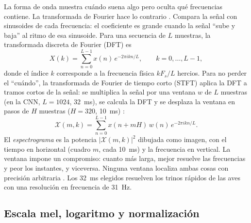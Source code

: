 La forma de onda muestra cuándo suena algo pero oculta qué frecuencias
contiene. La transformada de Fourier hace lo contrario
\citep[pp.~39--41]{muller2021fmp}. Compara la señal con sinusoides de cada
frecuencia: el coeficiente es grande cuando la señal ``sube y baja'' al
ritmo de esa sinusoide. Para una secuencia de $L$ muestras, la transformada
discreta de Fourier (DFT) es \citep[p.~52]{muller2021fmp}
\begin{equation}
  X(k) = \sum_{n=0}^{L-1} x(n)\, e^{-2\pi i k n / L}, \qquad k = 0, \dots, L-1,
  \label{eq:dft}
\end{equation}
donde el índice $k$ corresponde a la frecuencia física $k F_s / L$ hercios.
Para no perder el ``cuándo'', la transformada de Fourier de tiempo corto
(STFT) aplica la DFT a tramos cortos de la señal: se multiplica la señal por
una ventana $w$ de $L$ muestras (en la CNN, $L = 1024$, \SI{32}{\milli\second}),
se calcula la DFT y se desplaza la ventana en pasos de $H$ muestras ($H
= 320$, \SI{10}{\milli\second}) \citep[pp.~53--55]{muller2021fmp}:
\begin{equation}
  \mathcal{X}(m, k) = \sum_{n=0}^{L-1} x(n + mH)\, w(n)\, e^{-2\pi i k n / L}.
  \label{eq:stft}
\end{equation}
El \emph{espectrograma} es la potencia $|\mathcal{X}(m,k)|^2$ dibujada como
imagen, con el tiempo en horizontal (cuadro $m$, cada \SI{10}{\milli\second})
y la frecuencia en vertical. La ventana impone
un compromiso: cuanto más larga, mejor resuelve las frecuencias y peor los
instantes, y viceversa. Ninguna ventana localiza ambas cosas con precisión
arbitraria \citep[pp.~100--102]{muller2021fmp}. Los \SI{32}{\milli\second}
elegidos resuelven los trinos rápidos de las aves con una resolución en
frecuencia de \SI{31}{\hertz}.

\subsection{Escala mel, logaritmo y normalización}

